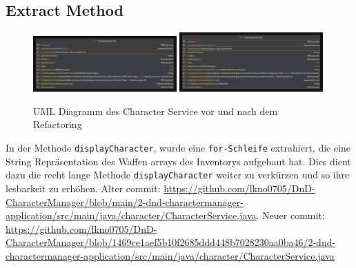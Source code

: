 \subsection{Extract Method}
\begin{figure}[H]
	\centering
	\includegraphics[width=0.49\textwidth]{Bilder/CharacterService.pdf}
	\includegraphics[width=0.49\textwidth]{Bilder/CharacterService-extracted.pdf}
	\caption{UML Diagramm des Character Service vor und nach dem Refactoring}
	\label{fig:extract}
\end{figure}
In der Methode \texttt{displayCharacter}, wurde eine \texttt{for-Schleife} extrahiert, die eine String Repräsentation des Waffen arrays des Inventorys aufgebaut hat. Dies dient dazu die recht lange Methode \texttt{displayCharacter} weiter zu verkürzen und so ihre lesbarkeit zu erhöhen.
Alter commit: \href{https://github.com/lkno0705/DnD-CharacterManager/blob/main/2-dnd-charactermanager-application/src/main/java/character/CharacterService.java}{https://github.com/lkno0705/DnD-CharacterManager/blob/main/2-dnd-charactermanager-application/src/main/java/character/CharacterService.java}. Neuer commit: \href{https://github.com/lkno0705/DnD-CharacterManager/blob/1469ce1aef5b10f2685ddd448b7028230aa0ba46/2-dnd-charactermanager-application/src/main/java/character/CharacterService.java}{https://github.com/lkno0705/DnD-CharacterManager/blob/1469ce1aef5b10f2685ddd448b7028230aa0ba46/2-dnd-charactermanager-application/src/main/java/character/CharacterService.java}
